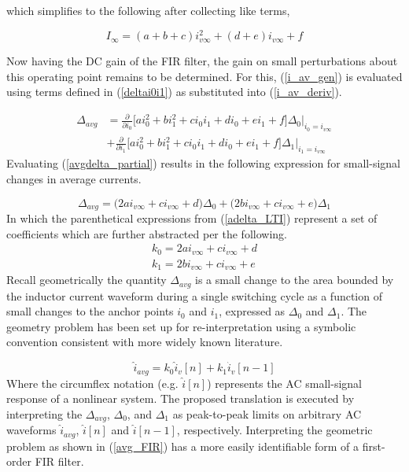 \documentclass[conference]{IEEEtran}
\begin{document}
which simplifies to the following after collecting like terms,

\begin{equation}
I_{\infty} = (a + b +c)i_{v \infty}^2 + (d+e)i_{v \infty} + f
\label{iavg_steady_state}
\end{equation}

Now having the DC gain of the FIR filter, the gain on small perturbations about this operating point remains to be determined.  For this,  (\ref{i_av_gen}) is evaluated using terms defined in (\ref{deltai0i1}) as substituted into (\ref{i_av_deriv}).

\begin{align}
	\Delta_{avg} &= 
	\frac{\partial}{\partial i_0} 
	\bigg [
	a i_0^2+b i_1^2+c i_0i_1+d i_0+e i_1+f \bigg ] 
	\Delta_0 \bigg |_{i_0=i_{v\infty}} \nonumber \\
	&+ 
	\frac{\partial}{\partial i_1} 
	\bigg [
	a i_0^2+b i_1^2+c i_0i_1+d i_0+e i_1+f \bigg ] 
	\Delta_1 \bigg |_{i_1=i_{v\infty}}
	\label{avgdelta_partial}
\end{align}
Evaluating (\ref{avgdelta_partial}) results in the following expression for small-signal changes in average currents.

\begin{equation}
	\Delta_{avg} = \big ( 2 a i_{v\infty} + c i_{v\infty} + d  \big) \Delta_0 + 
	\big ( 2 b i_{v\infty} + c i_{v\infty} + e  \big) \Delta_1
	\label{adelta_LTI}
\end{equation}
In which the parenthetical expressions from (\ref{adelta_LTI}) represent a set of coefficients which are further abstracted per the following.
\begin{align}
k_0 = 2 a i_{v\infty} + c i_{v\infty} + d \nonumber \\
k_1 = 2 b i_{v\infty} + c i_{v\infty} + e 
\end{align}
Recall geometrically the quantity $\Delta_{avg}$ is a small change to the area bounded by the inductor current waveform during a single switching cycle as a function of small changes to the anchor points $i_0$ and $i_1$, expressed as $\Delta_0$ and $\Delta_1$. The geometry problem has been set up for re-interpretation using a symbolic convention consistent with more widely known literature.

\begin{equation}
		\hat{i}_{avg} = k_0 \hat{i}_v[n] + 
	k_1 \hat{i}_v[n-1]
	\label{avg_FIR}
\end{equation}
Where the circumflex notation (e.g. $\hat{i}[n]$) represents the AC small-signal response of a nonlinear system. The proposed translation is executed by interpreting the $\Delta_{avg}$, $\Delta_0$, and $\Delta_1$ as peak-to-peak limits on arbitrary AC waveforms $\hat{i}_{avg}$, $\hat{i}[n]$ and $\hat{i}[n-1]$, respectively. Interpreting the geometric problem as shown in (\ref{avg_FIR}) has a more easily identifiable form of a first-order FIR filter.
\end{document}
